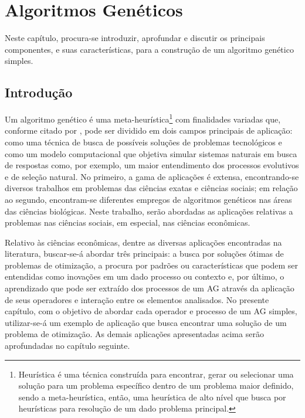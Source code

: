 \chapter{Algoritmos Genéticos}
\label{chap:altoritmos_geneticos}

Neste capítulo, procura-se introduzir, aprofundar e discutir os principais componentes, e suas características, para a construção de um algoritmo genético simples.

\section{Introdução}
\label{sec:introducao_aos_algoritmos_geneticos}

Um algoritmo genético é uma meta-heurística\footnote{Heurística é uma técnica construída para encontrar, gerar ou selecionar uma solução para um problema específico dentro de um problema maior definido, sendo a meta-heurística, então, uma heurística de alto nível que busca por heurísticas para resolução de um dado problema principal.} com finalidades variadas que, conforme citado por \citet[pg.27]{MelanieMitchell98}, pode ser dividido em dois campos principais de aplicação: como uma técnica de busca de possíveis soluções de problemas tecnológicos e como um modelo computacional que objetiva simular sistemas naturais em busca de respostas como, por exemplo, um maior entendimento dos processos evolutivos e de seleção natural. No primeiro, a gama de aplicações é extensa, encontrando-se diversos trabalhos em problemas das ciências exatas e ciências sociais; em relação ao segundo, encontram-se diferentes empregos de algoritmos genéticos nas áreas das ciências biológicas. Neste trabalho, serão abordadas as aplicações relativas a problemas nas ciências sociais, em especial, nas ciências econômicas.

Relativo às ciências econômicas, dentre as diversas aplicações encontradas na literatura, buscar-se-á abordar três principais: a busca por soluções ótimas de problemas de otimização, a procura por padrões ou características que podem ser entendidas como inovações em um dado processo ou contexto e, por último, o aprendizado que pode ser extraído dos processos de um AG através da aplicação de seus operadores e interação entre os elementos analisados. No presente capítulo, com o objetivo de abordar cada operador e processo de um AG simples, utilizar-se-á um exemplo de aplicação que busca encontrar uma solução de um problema de otimização. As demais aplicações apresentadas acima serão aprofundadas no capítulo seguinte.

